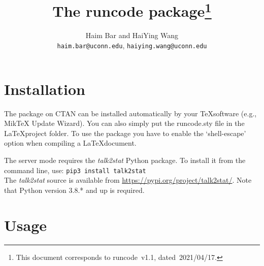 \documentclass{ltxdoc}
\begin{document}
    \title{The \textsf{runcode} package\thanks{This document  corresponds to \textsf{runcode}~v1.1, dated~2021/04/17.}}
    \author{Haim Bar and HaiYing Wang \\ \texttt{haim.bar@uconn.edu}, \texttt{haiying.wang@uconn.edu}}
    \maketitle


\section{Installation}
The package on CTAN can be installed automatically by your \TeX\space software (e.g., MikTeX Update Wizard). You can also simply put the runcode.sty file in the \LaTeX\space project folder. To use the package you have to enable the `shell-escape' option when compiling a \LaTeX\space document.
	
The server mode requires the \textit{talk2stat} Python package. To install it from the command line, use:
\verb|pip3 install talk2stat|\\
The \textit{talk2stat} source is available from \url{https://pypi.org/project/talk2stat/}.
Note that Python version 3.8.* and up is required.

\section{Usage}
\end{document}

